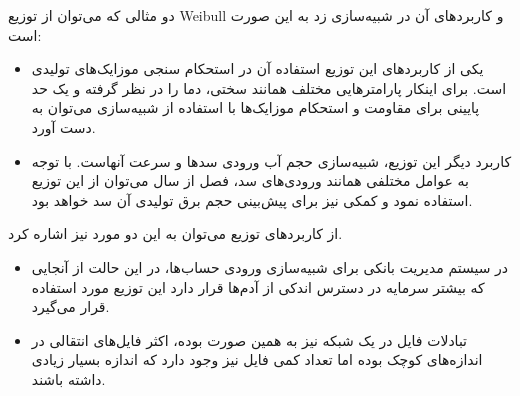دو مثالی که می‌توان از توزیع
Weibull
و کاربردهای آن در شبیه‌سازی زد به این صورت است:
\begin{itemize}
    \item
    یکی از کاربردهای این توزیع استفاده آن در استحکام سنجی موزایک‌های تولیدی است. برای اینکار پارامترهایی مختلف همانند سختی، دما را در نظر گرفته و یک حد پایینی برای مقاومت و استحکام موزایک‌ها با استفاده از شبیه‌سازی می‌توان به دست آورد.
    \item
    کاربرد دیگر این توزیع، شبیه‌سازی حجم آب ورودی سدها و سرعت آنهاست. با توجه به عوامل مختلفی همانند ورودی‌های سد، فصل از سال می‌توان از این توزیع استفاده نمود و کمکی نیز برای پیش‌بینی حجم برق تولیدی آن سد خواهد بود.
\end{itemize}

از کاربردهای توزیع
می‌توان به این دو مورد نیز اشاره کرد. 
\begin{itemize}
    \item
    در سیستم مدیریت بانکی برای شبیه‌سازی ورودی حساب‌ها، در این حالت از آنجایی که بیشتر سرمایه در دسترس اندکی از آدم‌ها قرار دارد این توزیع مورد استفاده قرار می‌گیرد.
    \item
    تبادلات فایل در یک شبکه نیز به همین صورت بوده، اکثر فایل‌های انتقالی در اندازه‌های کوچک بوده اما تعداد کمی فایل نیز وجود دارد که اندازه بسیار زیادی داشته باشند.
\end{itemize}